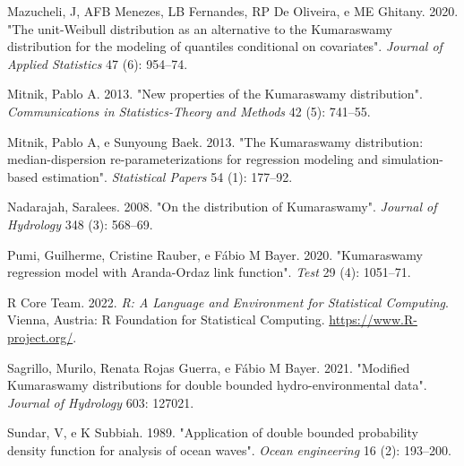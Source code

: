 \documentclass[
]{article}
\newlength{\cslhangindent}
\newlength{\cslentryspacingunit} %
\newenvironment{CSLReferences}[2] %
 {%
  \setlength{\parindent}{0pt}
  \ifodd #1
  \let\oldpar\par
  \def\par{\hangindent=\cslhangindent\oldpar}
  \fi
  \setlength{\parskip}{#2\cslentryspacingunit}
 }%
 {}
\begin{document}
\begin{CSLReferences}{1}{0}
\leavevmode{}%
Mazucheli, J, AFB Menezes, LB Fernandes, RP De Oliveira, e ME Ghitany.
2020. {"The unit-Weibull distribution as an alternative to the
Kumaraswamy distribution for the modeling of quantiles conditional on
covariates"}. \emph{Journal of Applied Statistics} 47 (6): 954--74.

\leavevmode{}%
Mitnik, Pablo A. 2013. {"New properties of the Kumaraswamy
distribution"}. \emph{Communications in Statistics-Theory and Methods}
42 (5): 741--55.

\leavevmode{}%
Mitnik, Pablo A, e Sunyoung Baek. 2013. {"The Kumaraswamy distribution:
median-dispersion re-parameterizations for regression modeling and
simulation-based estimation"}. \emph{Statistical Papers} 54 (1):
177--92.

\leavevmode{}%
Nadarajah, Saralees. 2008. {"On the distribution of Kumaraswamy"}.
\emph{Journal of Hydrology} 348 (3): 568--69.

\leavevmode{}%
Pumi, Guilherme, Cristine Rauber, e Fábio M Bayer. 2020. {"Kumaraswamy
regression model with Aranda-Ordaz link function"}. \emph{Test} 29 (4):
1051--71.

\leavevmode{}%
R Core Team. 2022. \emph{R: A Language and Environment for Statistical
Computing}. Vienna, Austria: R Foundation for Statistical Computing.
\url{https://www.R-project.org/}.

\leavevmode{}%
Sagrillo, Murilo, Renata Rojas Guerra, e Fábio M Bayer. 2021. {"Modified
Kumaraswamy distributions for double bounded hydro-environmental data"}.
\emph{Journal of Hydrology} 603: 127021.

\leavevmode{}%
Sundar, V, e K Subbiah. 1989. {"Application of double bounded
probability density function for analysis of ocean waves"}. \emph{Ocean
engineering} 16 (2): 193--200.

\end{CSLReferences}
\end{document}
